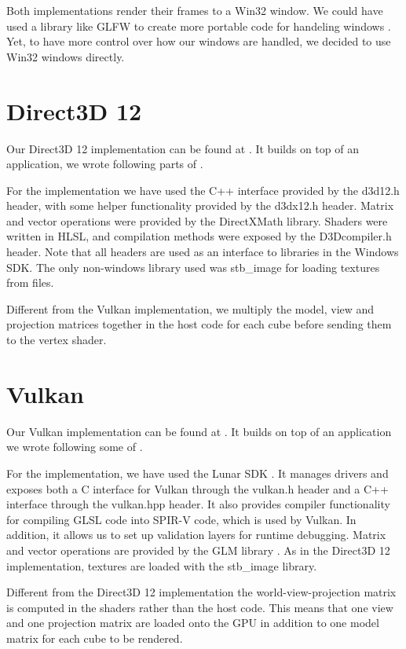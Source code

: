Both implementations render their frames to a Win32 window.
We could have used a library like GLFW to create more portable code for handeling windows \cite{GLFW}. 
Yet, to have more control  over how our windows are handled, we decided to use Win32 windows directly.  

\section{Direct3D 12}
Our Direct3D 12 implementation can be found at \cite{DX12Git}.
It builds on top of an application, we wrote following parts of \cite{DX12Tutorial}.

For the implementation we have used the C++ interface provided by the d3d12.h header, with some helper functionality provided by the d3dx12.h header.
Matrix and vector operations were provided by the DirectXMath library. 
Shaders were written in \gls{HLSL}, and compilation methods were exposed by the D3Dcompiler.h header.
Note that all headers are used as an interface to libraries in the Windows SDK. 
The only non-windows library used was stb\_image for loading textures from files\cite{StbGit}.

Different from the Vulkan implementation, we multiply the model, view and projection matrices together in the host code for each cube before sending them to the vertex shader.    


\section{Vulkan}
Our Vulkan implementation can be found at \cite{VulkanGit}.
It builds on top of an application we wrote following some of \citet{DX12Tutorial}. 

For the implementation, we have used the Lunar SDK \cite{LunarSDK}. 
It manages drivers and exposes both a C interface for Vulkan through the vulkan.h header and a C++ interface through the vulkan.hpp header. 
It also provides compiler functionality for compiling \gls{GLSL} code into SPIR-V code, which is used by Vulkan.
In addition, it allows us to set up validation layers for runtime debugging. 
Matrix and vector operations are provided by the GLM library \cite{GLM}. 
As in the Direct3D 12 implementation, textures are loaded with the stb\_image library. 

Different from the Direct3D 12 implementation the world-view-projection matrix is computed in the shaders rather than the host code.
This means that one view and one projection matrix are loaded onto the \gls{GPU} in addition to one model matrix for each cube to be rendered.